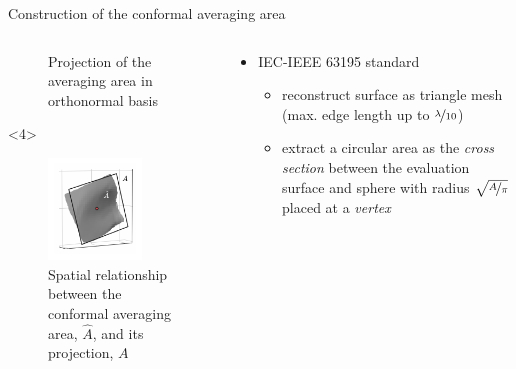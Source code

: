 \documentclass[xcolor=dvipsnames,10pt]{beamer}
\begin{document}
\begin{frame}{Construction of the conformal averaging area}
\begin{columns}[c]
\begin{column}{0.5\textwidth}
\begin{onlyenv}
\begin{center}
\begin{figure}
                    \caption{Projection of the averaging area in orthonormal basis}
                \end{figure}
                \end{center}
            \end{onlyenv}
            \begin{onlyenv}<4>
                \begin{center}
                \begin{figure}
                    \includegraphics[width=0.75\textwidth]{artwork/averaging_area_construction.conformal.pdf}
                    \caption{Spatial relationship between the conformal averaging area, $\hat A$, and its projection, $A$}
                \end{figure}
                \end{center}
            \end{onlyenv}
        \end{column} 
        \begin{column}{0.5\textwidth}
            \begin{itemize}
                \item<1> IEC-IEEE 63195 standard
                \begin{itemize}
                    \item reconstruct surface as triangle mesh (max. edge length up to $\nicefrac{\lambda}{10}$)
                    \item extract a circular area as the \emph{cross section} between the evaluation surface and sphere with radius $\sqrt{\nicefrac{A}{\pi}}$ placed at a \emph{vertex}

\end{itemize}
\end{itemize}
\end{column}
\end{columns}
\end{frame}
\end{document}
